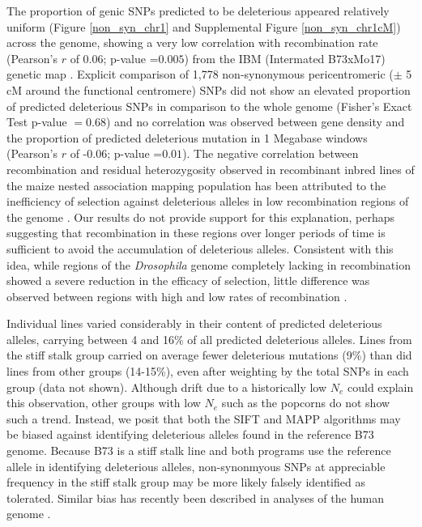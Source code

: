 \documentclass[12pt]{article}
\begin{document}
The proportion of genic SNPs predicted to be deleterious appeared relatively uniform (Figure \ref{non_syn_chr1} and  Supplemental Figure \ref{non_syn_chr1cM}) across the genome, showing a very low correlation with recombination rate (Pearson's $r$ of 0.06; p-value =$0.005$) from the IBM (Intermated B73xMo17) genetic map \citep{Gerke2013}.  Explicit comparison of 1,778 non-synonymous pericentromeric ($\pm$ 5 cM around the functional centromere) SNPs did not show an elevated proportion of predicted deleterious SNPs  in comparison to the whole genome (Fisher's Exact Test p-value $= 0.68$) and no correlation was observed between gene density and the proportion of predicted deleterious mutation in 1 Megabase windows (Pearson's $r$ of -0.06; p-value =$0.01$). 
The negative correlation between recombination and residual heterozygosity observed in recombinant inbred lines of the maize nested association mapping population has been attributed to the inefficiency of selection against deleterious alleles in low recombination regions of the genome \citep{McMullen2009,Gore2009}. 
Our results do not provide support for this explanation, perhaps suggesting that recombination in these regions over longer periods of time is sufficient to avoid the accumulation of deleterious alleles. Consistent with this idea, while regions of the \emph{Drosophila} genome completely lacking in recombination showed a severe reduction in the efficacy of selection, little difference was observed between regions with high and low rates of recombination \citep{Haddrill2007}.

Individual lines varied considerably in their content of predicted deleterious alleles, carrying between 4 and 16\% of all predicted deleterious alleles. Lines from the stiff stalk group carried on average fewer deleterious mutations (9\%) than did lines from other groups (14-15\%), even after weighting by the total SNPs in each group (data not shown).  Although drift due to a  historically low $N_{e}$ \citep{Messmer1991} could explain this observation, other groups with low $N_{e}$ such as the popcorns do not show such a trend.  Instead, we posit that both the SIFT and MAPP algorithms may be biased against identifying deleterious alleles found in the reference B73 genome. Because B73 is a stiff stalk line and both programs use the reference allele in identifying deleterious alleles, non-synonmyous SNPs at appreciable frequency in the stiff stalk group may be more likely falsely identified as tolerated. Similar bias has recently been described in analyses of the human genome \citep{Simons2013}.
\end{document}
